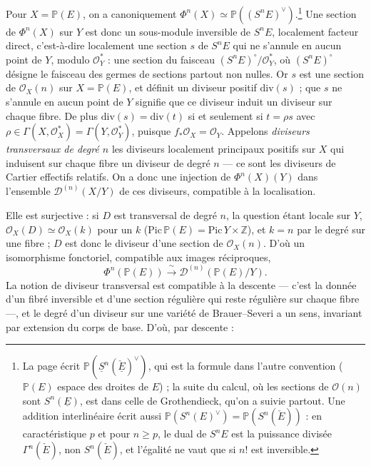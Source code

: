 \documentclass[11pt,a4paper]{article}
\begin{document}
Pour $X = \mathbb{P}(E)$, on a canoniquement $\Phi^{n}(X) \simeq
\mathbb{P}((S^{n}E)^{\vee})$.\footnote{La page écrit
$\mathbb{P}(\underline{S}^{n}(\check{\underline{E}})^{\vee})$, qui est la
formule dans l'autre convention ($\mathbb{P}(E)$ espace des droites de $E$) ;
la suite du calcul, où les sections de $\mathcal{O}(n)$ sont
$S^{n}(\underline{E})$, est dans celle de Grothendieck, qu'on a suivie
partout. Une addition interlinéaire écrit aussi $\mathbb{P}(S^{n}(E)^{\vee}) =
\mathbb{P}(S^{n}(\check{E}))$ : en caractéristique $p$ et pour $n \ge p$, le dual
de $S^{n}E$ est la puissance divisée $\Gamma^{n}(\check{E})$, non
$S^{n}(\check{E})$, et l'égalité ne vaut que si $n!$ est inversible.} Une section
de $\Phi^{n}(X)$ sur $Y$ est donc un sous-module inversible de $S^{n}E$,
localement facteur direct, c'est-à-dire localement une section $s$ de $S^{n}E$
qui ne s'annule en aucun point de $Y$, modulo $\mathcal{O}_Y^{*}$ : une section
du faisceau $(S^{n}E)^{\circ}/\mathcal{O}_Y^{*}$, où $(S^{n}E)^{\circ}$ désigne
le faisceau des germes de sections partout non nulles. Or $s$ est une section
de $\mathcal{O}_X(n)$ sur $X = \mathbb{P}(E)$, et définit un diviseur positif
$\mathrm{div}(s)$ ; que $s$ ne s'annule en aucun point de $Y$ signifie que ce
diviseur induit un diviseur sur chaque fibre. De plus $\mathrm{div}(s) =
\mathrm{div}(t)$ si et seulement si $t = \rho s$ avec $\rho \in \Gamma(X,
\mathcal{O}_X^{*}) = \Gamma(Y, \mathcal{O}_Y^{*})$, puisque $f_{*}\mathcal{O}_X =
\mathcal{O}_Y$. Appelons \emph{diviseurs transversaux de degré $n$} les
diviseurs localement principaux positifs sur $X$ qui induisent sur chaque fibre
un diviseur de degré $n$ — ce sont les diviseurs de Cartier effectifs relatifs.
On a donc une injection de $\Phi^{n}(X)(Y)$ dans l'ensemble
$\mathcal{D}^{(n)}(X/Y)$ de ces diviseurs, compatible à la localisation.

Elle est surjective : si $D$ est transversal de degré $n$, la question étant
locale sur $Y$, $\mathcal{O}_X(D) \simeq \mathcal{O}_X(k)$ pour un $k$
($\mathrm{Pic}\,\mathbb{P}(E) = \mathrm{Pic}\,Y \times \mathbb{Z}$), et $k = n$ par
le degré sur une fibre ; $D$ est donc le diviseur d'une section de
$\mathcal{O}_X(n)$. D'où un isomorphisme fonctoriel, compatible aux images
réciproques,
\[
\Phi^{n}(\mathbb{P}(E)) \xrightarrow{\ \sim\ } \mathcal{D}^{(n)}(\mathbb{P}(E)/Y).
\]
La notion de diviseur transversal est compatible à la descente — c'est la
donnée d'un fibré inversible et d'une section régulière qui reste régulière sur
chaque fibre —, et le degré d'un diviseur sur une variété de Brauer–Severi a un
sens, invariant par extension du corps de base. D'où, par descente :
\end{document}
